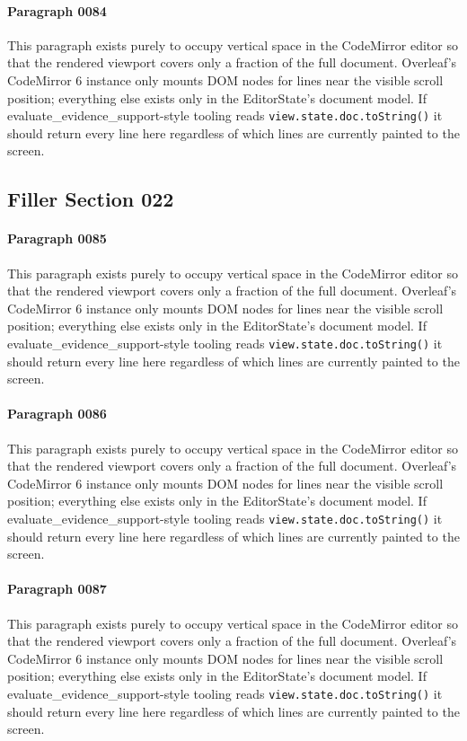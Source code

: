 \documentclass{article}
\begin{document}
\paragraph{Paragraph 0084}
This paragraph exists purely to occupy vertical space in the CodeMirror editor so that the rendered viewport covers only a fraction of the full document. Overleaf's CodeMirror 6 instance only mounts DOM nodes for lines near the visible scroll position; everything else exists only in the EditorState's document model. If evaluate\_evidence\_support-style tooling reads \texttt{view.state.doc.toString()} it should return every line here regardless of which lines are currently painted to the screen.

\subsection{Filler Section 022}
\paragraph{Paragraph 0085}
This paragraph exists purely to occupy vertical space in the CodeMirror editor so that the rendered viewport covers only a fraction of the full document. Overleaf's CodeMirror 6 instance only mounts DOM nodes for lines near the visible scroll position; everything else exists only in the EditorState's document model. If evaluate\_evidence\_support-style tooling reads \texttt{view.state.doc.toString()} it should return every line here regardless of which lines are currently painted to the screen.

\paragraph{Paragraph 0086}
This paragraph exists purely to occupy vertical space in the CodeMirror editor so that the rendered viewport covers only a fraction of the full document. Overleaf's CodeMirror 6 instance only mounts DOM nodes for lines near the visible scroll position; everything else exists only in the EditorState's document model. If evaluate\_evidence\_support-style tooling reads \texttt{view.state.doc.toString()} it should return every line here regardless of which lines are currently painted to the screen.

\paragraph{Paragraph 0087}
This paragraph exists purely to occupy vertical space in the CodeMirror editor so that the rendered viewport covers only a fraction of the full document. Overleaf's CodeMirror 6 instance only mounts DOM nodes for lines near the visible scroll position; everything else exists only in the EditorState's document model. If evaluate\_evidence\_support-style tooling reads \texttt{view.state.doc.toString()} it should return every line here regardless of which lines are currently painted to the screen.
\end{document}

